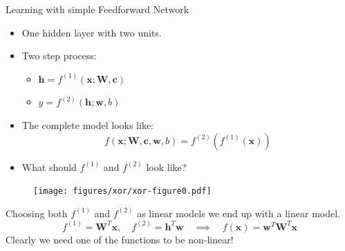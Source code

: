 \documentclass[]{beamer}
\begin{document}
\begin{frame}
   {Learning with simple Feedforward Network}
   \scriptsize
   \begin{minipage}{0.475\linewidth}
      \begin{itemize}
         \item
            One hidden layer with two units.
         \item
            Two step process: 
            \begin{itemize}
               \item
                  $\boldsymbol{h} = f^{(1)} \left( \boldsymbol{x}; \boldsymbol{W}, \boldsymbol{c} \right)$
               \item
                  $y = f^{(2)} \left( \boldsymbol{h}; \boldsymbol{w}, b \right)$
            \end{itemize}
         \item
            The complete model looks like:
            \begin{equation*}
                  f \left(\boldsymbol{x}; \boldsymbol{W}, \boldsymbol{c}, \boldsymbol{w}, b \right) = f^{(2)}\left(f^{(1)}\left( \boldsymbol{x} \right) \right)
            \end{equation*}
         \item
            What should $f^{(1)}$ and $f^{(2)}$ look like?
      \end{itemize}

   \end{minipage}
   \begin{minipage}{0.475\linewidth}
      \begin{figure}
         \texttt{[image: figures/xor/xor-figure0.pdf]}
      \end{figure}
   \end{minipage}
   
   \vspace{1cm}
   Choosing both $f^{(1)}$ and $f^{(2)}$ as linear models we end up with a linear model.
   \begin{equation*}
      f^{(1)} = \boldsymbol{W}^T \boldsymbol{x}, \quad f^{(2)} = \boldsymbol{h}^T \boldsymbol{w} \quad \implies \quad f(\boldsymbol{x}) = \boldsymbol{w}^T \boldsymbol{W}^T \boldsymbol{x}
   \end{equation*}
   Clearly we need one of the functions to be non-linear!
\end{frame}
\end{document}
